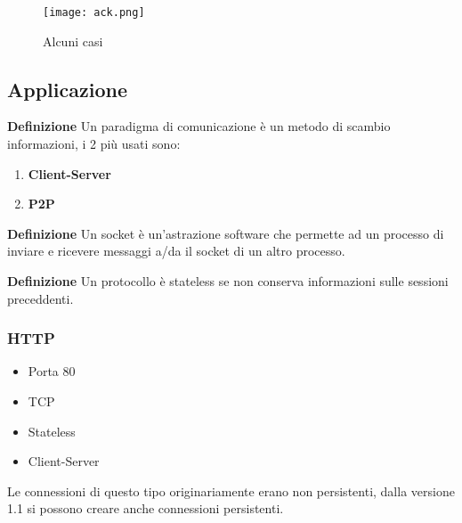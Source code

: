 \documentclass{article}
\begin{document}
\noindent

\begin{figure}[ht]
    \centering
    \texttt{[image: ack.png]}
    \caption{Alcuni casi}
    \label{fig:ack}
\end{figure}

\subsection{Applicazione}

\textbf{Definizione} Un paradigma di comunicazione è un metodo di scambio informazioni, i 2 più usati sono:
\begin{enumerate}
    \item \textbf{Client-Server}
    \item \textbf{P2P} \newline
\end{enumerate}

\noindent\textbf{Definizione} Un socket è un'astrazione software che permette ad un processo di inviare e ricevere messaggi a/da il socket di un altro processo.\newline

\noindent\textbf{Definizione} Un protocollo è stateless se non conserva informazioni sulle sessioni preceddenti.\newline

\subsubsection{HTTP}
\begin{itemize}
    \item Porta 80
    \item TCP
    \item Stateless
    \item Client-Server\newline
\end{itemize}

\noindent Le connessioni di questo tipo originariamente erano non persistenti, dalla versione 1.1 si possono creare anche connessioni persistenti.\newline
\end{document}
